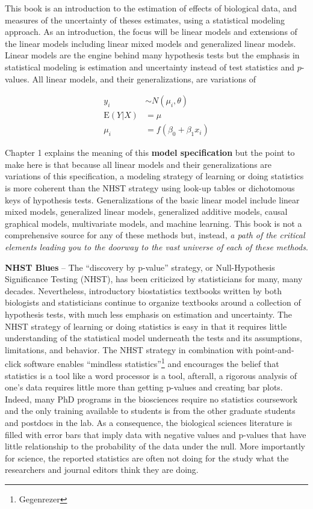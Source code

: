\documentclass[]{book}
\let\rmarkdownfootnote\footnote%
\def\footnote{\protect\rmarkdownfootnote}
\begin{document}
This book is an introduction to the estimation of effects of biological
data, and measures of the uncertainty of theses estimates, using a
statistical modeling approach. As an introduction, the focus will be
linear models and extensions of the linear models including linear mixed
models and generalized linear models. Linear models are the engine
behind many hypothesis tests but the emphasis in statistical modeling is
estimation and uncertainty instead of test statistics and \(p\)-values.
All linear models, and their generalizations, are variations of

\begin{align}
y_i &\sim N(\mu_i, \theta)\\
\mathrm{E}(Y|X) &= \mu\\
\mu_i &= f(\beta_0 + \beta_1 x_i)
\end{align}

Chapter 1 explains the meaning of this \textbf{model specification} but
the point to make here is that because all linear models and their
generalizations are variations of this specification, a modeling
strategy of learning or doing statistics is more coherent than the NHST
strategy using look-up tables or dichotomous keys of hypothesis tests.
Generalizations of the basic linear model include linear mixed models,
generalized linear models, generalized additive models, causal graphical
models, multivariate models, and machine learning. This book is not a
comprehensive source for any of these methods but, instead, \emph{a path
of the critical elements leading you to the doorway to the vast universe
of each of these methods}.

\textbf{NHST Blues} -- The ``discovery by p-value'' strategy, or
Null-Hypothesis Significance Testing (NHST), has been criticized by
statisticians for many, many decades. Nevertheless, introductory
biostatistics textbooks written by both biologists and statisticians
continue to organize textbooks around a collection of hypothesis tests,
with much less emphasis on estimation and uncertainty. The NHST strategy
of learning or doing statistics is easy in that it requires little
understanding of the statistical model underneath the tests and its
assumptions, limitations, and behavior. The NHST strategy in combination
with point-and-click software enables ``mindless statistics''\footnote{Gegenrezer}
and encourages the belief that statistics is a tool like a word
processor is a tool, afterall, a rigorous analysis of one's data
requires little more than getting p-values and creating bar plots.
Indeed, many PhD programs in the biosciences require no statistics
coursework and the only training available to students is from the other
graduate students and postdocs in the lab. As a consequence, the
biological sciences literature is filled with error bars that imply data
with negative values and p-values that have little relationship to the
probability of the data under the null. More importantly for science,
the reported statistics are often not doing for the study what the
researchers and journal editors think they are doing.
\end{document}
